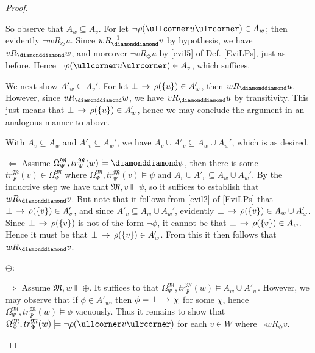 \documentclass[11pt]{article}
\newcommand{\DD}{\diamonddiamond}
\newcommand{\Pos}{\Diamond}
\newcommand{\lc}{\ullcorner}
\newcommand{\rc}{\ulrcorner}
\begin{document}
\begin{proof}
\begin{peano}
\begin{peano}
	
	So observe that $A_w \subseteq A_v$.  For let $\neg \rho(\lc u\rc) \in  A_w$; then evidently $\neg w R_\Pos u$.  Since $w R_\DD^{-1} v$ by hypothesis, we have $v R_\DD w$, and moreover $\neg v R_\Pos u$ by \ref{evil5} of Def. \ref{EviLPs}, just as before.  Hence $\neg \rho(\lc u\rc) \in A_v$, which suffices.
	
	We next show $A'_w \subseteq A_v'$. For let $\bot \,\rightarrow\, \rho(\{ u \}) \in A'_w$, then $w R_\DD u$.  However, since $v R_\DD w$, we have $v R_\DD u$ by transitivity.  This just means that $\bot \,\rightarrow\, \rho(\{ u \}) \in A'_w$, hence we may conclude the argument in an analogous manner to above.
	
	With $A_v \subseteq A_w$ and $A'_v \subseteq A_w'$, we have $A_v \cup A'_v \subseteq A_w \cup A_w'$, which is as desired.
	
	\item $\Leftarrow$  Assume $\Omega_{\Psi}^\mathfrak{M}, tr_{\Psi}^\mathfrak{M}(w) \models \DD\psi$, then there is some $tr_{\Psi}^\mathfrak{M}(v) \in \Omega_{\Psi}^\mathfrak{M}$ where $\Omega_{\Psi}^\mathfrak{M}, tr_{\Psi}^\mathfrak{M}(v) \models \psi$ and $A_v \cup A'_v \subseteq A_w \cup A_w'$.  By the inductive step we have that $\mathfrak{M},v \Vdash \psi$, so it suffices to establish that $w R_\DD v$.  But note that it follows from \ref{evil2} of \ref{EviLPs} that $\bot \,\rightarrow\, \rho(\{v\}) \in A'_v$, and since $A'_v \subseteq A_w \cup A_w'$, evidently $\bot \,\rightarrow\, \rho(\{v\}) \in A_w \cup A_w'$.  Since $\bot \,\rightarrow\, \rho(\{v\})$ is not of the form $\neg \phi$, it cannot be that $\bot \,\rightarrow\, \rho(\{v\})\in A_w$.  Hence it must be that $\bot \,\rightarrow\, \rho(\{v\}) \in A'_w$.  From this it then follows that $w R_\DD v$.
 \end{peano}
 \item $\oplus$:
 \begin{peano}
 	\item $\Rightarrow$ Assume $\mathfrak{M},w \Vdash \oplus$.  It suffices to that $\Omega_{\Psi}^\mathfrak{M}, tr_{\Psi}^\mathfrak{M}(w) \models A_w \cup A'_w$.  However, we may observe that if $\phi \in A'_w$, then $\phi = \bot \,\rightarrow\, \chi$ for some $\chi$, hence $\Omega_{\Psi}^\mathfrak{M}, tr_{\Psi}^\mathfrak{M}(w) \models \phi$ vacuously.  Thus it remains to show that $\Omega_{\Psi}^\mathfrak{M}, tr_{\Psi}^\mathfrak{M}(w) \models \neg \rho(\lc v \rc)$ for each $v \in W$ where $\neg w R_\Pos v$.
 

\end{peano}
\end{peano}
\end{proof}
\end{document}
